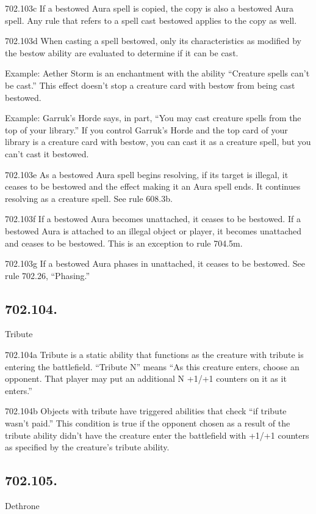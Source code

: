 702.103c If a bestowed Aura spell is copied, the copy is also a bestowed Aura spell. Any rule that refers to a spell cast bestowed applies to the copy as well.

702.103d When casting a spell bestowed, only its characteristics as modified by the bestow ability are evaluated to determine if it can be cast.

Example: Aether Storm is an enchantment with the ability “Creature spells can’t be cast.” This effect doesn’t stop a creature card with bestow from being cast bestowed.

Example: Garruk’s Horde says, in part, “You may cast creature spells from the top of your library.” If you control Garruk’s Horde and the top card of your library is a creature card with bestow, you can cast it as a creature spell, but you can’t cast it bestowed.

702.103e As a bestowed Aura spell begins resolving, if its target is illegal, it ceases to be bestowed and the effect making it an Aura spell ends. It continues resolving as a creature spell. See rule 608.3b.

702.103f If a bestowed Aura becomes unattached, it ceases to be bestowed. If a bestowed Aura is attached to an illegal object or player, it becomes unattached and ceases to be bestowed. This is an exception to rule 704.5m.

702.103g If a bestowed Aura phases in unattached, it ceases to be bestowed. See rule 702.26, “Phasing.”

\subsection*{702.104.}
Tribute

702.104a Tribute is a static ability that functions as the creature with tribute is entering the battlefield. “Tribute N” means “As this creature enters, choose an opponent. That player may put an additional N +1/+1 counters on it as it enters.”

702.104b Objects with tribute have triggered abilities that check “if tribute wasn’t paid.” This condition is true if the opponent chosen as a result of the tribute ability didn’t have the creature enter the battlefield with +1/+1 counters as specified by the creature’s tribute ability.

\subsection*{702.105.}
Dethrone

